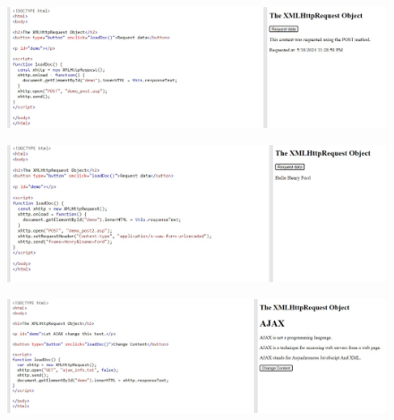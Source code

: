 \documentclass{article}
\begin{document}
\begin{itemize}
		\begin{figure}[H]
			\centering
			\includegraphics[width=1.0\textwidth,keepaspectratio]{img/A8.jpg}
		\end{figure}

		\begin{figure}[H]
			\centering
			\includegraphics[width=1.0\textwidth,keepaspectratio]{img/A9.jpg}
		\end{figure}

		\begin{figure}[H]
			\centering
			\includegraphics[width=1.0\textwidth,keepaspectratio]{img/A10.jpg}
		\end{figure}



\end{itemize}
\end{document}
